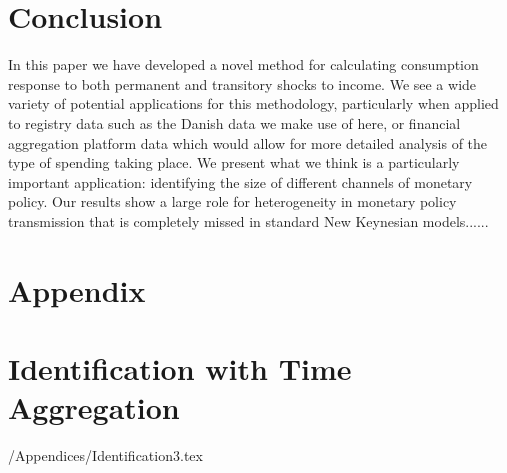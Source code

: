 \documentclass[titlepage]{\econtex}\newcommand{\texname}{ConsumptionHeterogeneity}
\begin{document}
\section{Conclusion}
In this paper we have developed a novel method for calculating consumption response to both permanent and transitory shocks to income. We see a wide variety of potential applications for this methodology, particularly when applied to registry data such as the Danish data we make use of here, or financial aggregation platform data which would allow for more detailed analysis of the type of spending taking place. We present what we think is a particularly important application: identifying the size of different channels of monetary policy. Our results show a large role for heterogeneity in monetary policy transmission that is completely missed in standard New Keynesian models......




\processdelayedfloats

\small

\normalsize

\pagebreak
\appendix
\renewcommand\thefigure{\thesection.\arabic{figure}}  
\renewcommand\thetable{\thesection.\arabic{table}}  

\section*{Appendix}

\section{Identification with Time Aggregation}\label{sec:Identification}

\setcounter{figure}{0}   
\setcounter{table}{0} 
\econtexRoot/Appendices/Identification3.tex

\end{document}

